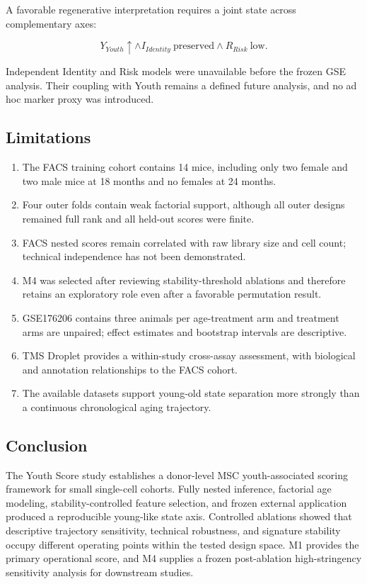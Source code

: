 \documentclass[10pt,twocolumn]{article}
\providecommand{\tightlist}{\setlength{\itemsep}{0pt}\setlength{\parskip}{0pt}}
\begin{document}
A favorable regenerative interpretation requires a joint state across complementary axes:

\[
Y_{Youth}\uparrow
\land I_{Identity}\ \mathrm{preserved}
\land R_{Risk}\ \mathrm{low}.
\]

Independent Identity and Risk models were unavailable before the frozen GSE analysis. Their coupling with Youth remains a defined future analysis, and no ad hoc marker proxy was introduced.

\subsection{Limitations}\label{limitations}

\begin{enumerate}
\def\labelenumi{\arabic{enumi}.}
\tightlist
\item
  The FACS training cohort contains 14 mice, including only two female and two male mice at 18 months and no females at 24 months.
\item
  Four outer folds contain weak factorial support, although all outer designs remained full rank and all held-out scores were finite.
\item
  FACS nested scores remain correlated with raw library size and cell count; technical independence has not been demonstrated.
\item
  M4 was selected after reviewing stability-threshold ablations and therefore retains an exploratory role even after a favorable permutation result.
\item
  GSE176206 contains three animals per age-treatment arm and treatment arms are unpaired; effect estimates and bootstrap intervals are descriptive.
\item
  TMS Droplet provides a within-study cross-assay assessment, with biological and annotation relationships to the FACS cohort.
\item
  The available datasets support young-old state separation more strongly than a continuous chronological aging trajectory.
\end{enumerate}

\subsection{Conclusion}\label{conclusion}

The Youth Score study establishes a donor-level MSC youth-associated scoring framework for small single-cell cohorts. Fully nested inference, factorial age modeling, stability-controlled feature selection, and frozen external application produced a reproducible young-like state axis. Controlled ablations showed that descriptive trajectory sensitivity, technical robustness, and signature stability occupy different operating points within the tested design space. M1 provides the primary operational score, and M4 supplies a frozen post-ablation high-stringency sensitivity analysis for downstream studies.
\end{document}
